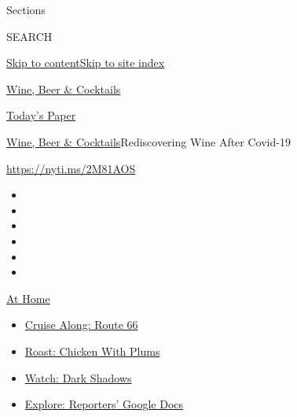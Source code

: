 Sections

SEARCH

\protect\hyperlink{site-content}{Skip to
content}\protect\hyperlink{site-index}{Skip to site index}

\href{https://www.nytimes3xbfgragh.onion/section/food/drinks}{Wine, Beer
\& Cocktails}

\href{https://myaccount.nytimes3xbfgragh.onion/auth/login?response_type=cookie\&client_id=vi}{}

\href{https://www.nytimes3xbfgragh.onion/section/todayspaper}{Today's
Paper}

\href{/section/food/drinks}{Wine, Beer \&
Cocktails}\textbar{}Rediscovering Wine After Covid-19

\url{https://nyti.ms/2M81AOS}

\begin{itemize}
\item
\item
\item
\item
\item
\item
\end{itemize}

\href{https://www.nytimes3xbfgragh.onion/spotlight/at-home?action=click\&pgtype=Article\&state=default\&region=TOP_BANNER\&context=at_home_menu}{At
Home}

\begin{itemize}
\tightlist
\item
  \href{https://www.nytimes3xbfgragh.onion/2020/09/07/travel/route-66.html?action=click\&pgtype=Article\&state=default\&region=TOP_BANNER\&context=at_home_menu}{Cruise
  Along: Route 66}
\item
  \href{https://www.nytimes3xbfgragh.onion/2020/09/04/dining/sheet-pan-chicken.html?action=click\&pgtype=Article\&state=default\&region=TOP_BANNER\&context=at_home_menu}{Roast:
  Chicken With Plums}
\item
  \href{https://www.nytimes3xbfgragh.onion/2020/09/04/arts/television/dark-shadows-stream.html?action=click\&pgtype=Article\&state=default\&region=TOP_BANNER\&context=at_home_menu}{Watch:
  Dark Shadows}
\item
  \href{https://www.nytimes3xbfgragh.onion/interactive/2020/at-home/even-more-reporters-editors-diaries-lists-recommendations.html?action=click\&pgtype=Article\&state=default\&region=TOP_BANNER\&context=at_home_menu}{Explore:
  Reporters' Google Docs}
\end{itemize}

